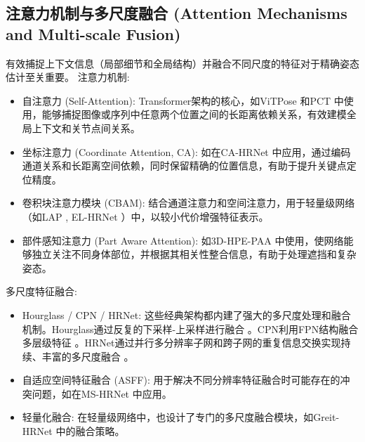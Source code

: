 \documentclass[12pt,a4paper]{article}
\begin{document}
\subsection{注意力机制与多尺度融合 (Attention Mechanisms and Multi-scale Fusion)}
有效捕捉上下文信息（局部细节和全局结构）并融合不同尺度的特征对于精确姿态估计至关重要。
注意力机制:
\begin{itemize}
    \item 自注意力 (Self-Attention): Transformer架构的核心，如ViTPose \cite{Xu2022ViTPose} 和PCT \cite{Geng2023PCT} 中使用，能够捕捉图像或序列中任意两个位置之间的长距离依赖关系，有效建模全局上下文和关节点间关系。
    \item 坐标注意力 (Coordinate Attention, CA): 如在CA-HRNet \cite{Hou2021CoordinateAttention} 中应用，通过编码通道关系和长距离空间依赖，同时保留精确的位置信息，有助于提升关键点定位精度。
    \item 卷积块注意力模块 (CBAM): 结合通道注意力和空间注意力，用于轻量级网络（如LAP \cite{Zhang2020LAPNet}, EL-HRNet \cite{Wang2022ELHRNet}）中，以较小代价增强特征表示。
    \item 部件感知注意力 (Part Aware Attention): 如3D-HPE-PAA \cite{Li2022PartAwareAttention} 中使用，使网络能够独立关注不同身体部位，并根据其相关性整合信息，有助于处理遮挡和复杂姿态。 %
\end{itemize}
多尺度特征融合:
\begin{itemize}
    \item Hourglass / CPN / HRNet: 这些经典架构都内建了强大的多尺度处理和融合机制。Hourglass通过反复的下采样-上采样进行融合 \cite{Newell2016StackedHourglass}。CPN利用FPN结构融合多层级特征 \cite{Chen2018CPN}。HRNet通过并行多分辨率子网和跨子网的重复信息交换实现持续、丰富的多尺度融合 \cite{Sun2019HRNet}。
    \item 自适应空间特征融合 (ASFF): 用于解决不同分辨率特征融合时可能存在的冲突问题，如在MS-HRNet \cite{Wang2021HRNetTPAMI} 中应用。
    \item 轻量化融合: 在轻量级网络中，也设计了专门的多尺度融合模块，如Greit-HRNet \cite{Li2021GreitHRNet} 中的融合策略。
\end{itemize}
\end{document}
